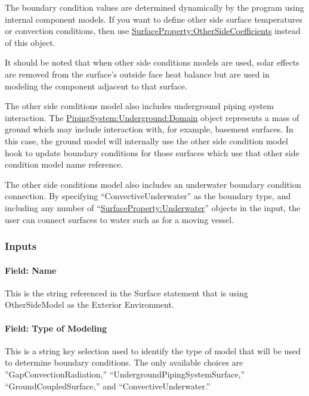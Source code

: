 The boundary condition values are determined dynamically by the program using internal component models. If you want to define other side surface temperatures or convection conditions, then use \hyperref[surfacepropertyothersidecoefficients]{SurfaceProperty:OtherSideCoefficients} instead of this object.

It should be noted that when other side conditions models are used, solar effects are removed from the surface's outside face heat balance but are used in modeling the component adjacent to that surface.

The other side conditions model also includes underground piping system interaction. The \hyperref[pipingsystemundergrounddomain]{PipingSystem:Underground:Domain} object represents a mass of ground which may include interaction with, for example, basement surfaces. In this case, the ground model will internally use the other side condition model hook to update boundary conditions for those surfaces which use that other side condition model name reference.

The other side conditions model also includes an underwater boundary condition connection.  By specifying ``ConvectiveUnderwater'' as the boundary type, and including any number of ``\hyperref[surfacepropertyunderwater]{SurfaceProperty:Underwater}'' objects in the input, the user can connect surfaces to water such as for a moving vessel.

\subsubsection{Inputs}\label{inputs-5}

\paragraph{Field: Name}\label{field-name-4}

This is the string referenced in the Surface statement that is using OtherSideModel as the Exterior Environment.

\paragraph{Field: Type of Modeling}\label{field-type-of-modeling}

This is a string key selection used to identify the type of model that will be used to determine boundary conditions. The only available choices are ''GapConvectionRadiation,'' ``UndergroundPipingSystemSurface,'' ``GroundCoupledSurface,'' and ``ConvectiveUnderwater.''

